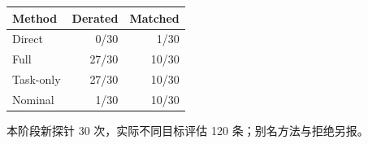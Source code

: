 \begin{center}\small
\begin{tabular}{lrr}
\toprule
Method & Derated & Matched\\
\midrule
Direct & 0/30 & 1/30\\
Full & 27/30 & 10/30\\
Task-only & 27/30 & 10/30\\
Nominal & 1/30 & 10/30\\
\bottomrule
\end{tabular}
\end{center}
本阶段新探针 30 次，实际不同目标评估 120 条；别名方法与拒绝另报。
